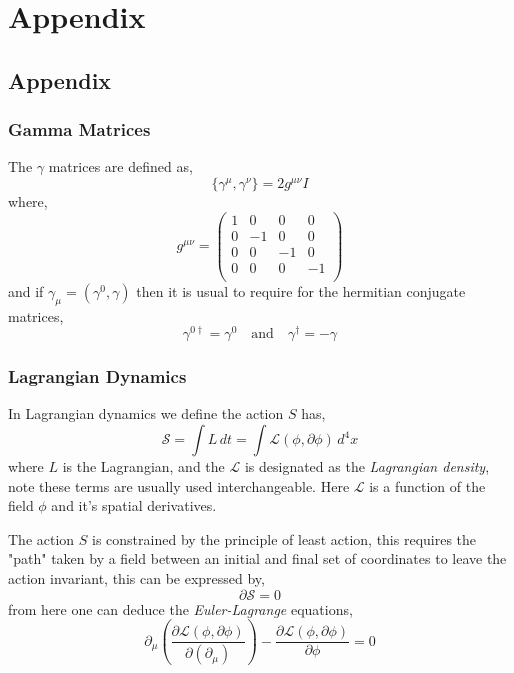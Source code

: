 \chapter{Appendix}

\section{Appendix}

\subsection{Gamma Matrices}
The $\gamma$ matrices are defined as, 
\begin{equation}
\{  \gamma^\mu , \gamma^\nu \} = 2 g^{\mu \nu} I 
\end{equation}
where, 
\begin{equation}
g^{ \mu \nu } = 
\begin{pmatrix}
1 & 0 & 0 & 0 \\
0 & -1 & 0 & 0  \\
0 & 0 & -1 & 0 \\
0 & 0 & 0 & -1 \\
\end{pmatrix}
\end{equation}
and if $\gamma_\mu = (\gamma^0, \gamma)$  then it is usual to require for the hermitian conjugate matrices,
\begin{equation}
\gamma^{0 \dagger} = \gamma^0 \quad \textrm{and} \quad \gamma^\dagger = - \gamma 
\end{equation}


\subsection{Lagrangian Dynamics}

In Lagrangian dynamics we define the action $S$ has, 
\begin{equation}
\mathcal{S} = \int L \, dt = \int \mathcal{L}(\phi,\partial \phi ) \, d^4x  
\end{equation}
where $L$ is the Lagrangian, and the $\mathcal{L}$ is designated as the \textit{Lagrangian density}, note these terms are
usually used interchangeable. Here $\mathcal{L}$ is a function of the field $\phi$ and it's spatial derivatives. 

The action $S$ is constrained by the principle of least action, this requires the "path" taken by a field between an initial and final set
of coordinates to leave the action invariant, this can be expressed by,
\begin{equation}
\partial \mathcal{S} = 0 
\end{equation}
from here one can deduce the \textit{Euler-Lagrange} equations,
\begin{equation}
\partial_\mu \left( \frac{\partial \mathcal{L}(\phi,\partial \phi ) }{ \partial (\partial_\mu) } \right) - \frac{ \partial \mathcal{L}(\phi,\partial \phi ) }{ \partial \phi }  = 0 
\end{equation} 